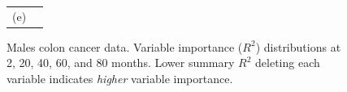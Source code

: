 \documentclass[12pt]{article}
\begin{document}
\begin{figure}
\begin{tabular}{cc}
   (e) 
\end{tabular}
\caption{ Males colon cancer data. Variable importance ($R^2$) distributions at 2, 20, 40, 60, and 80 months. Lower summary $R^2$ deleting each variable indicates \emph{higher} variable importance.\label{fig:vimp_males}}
\end{figure}
\end{document}
